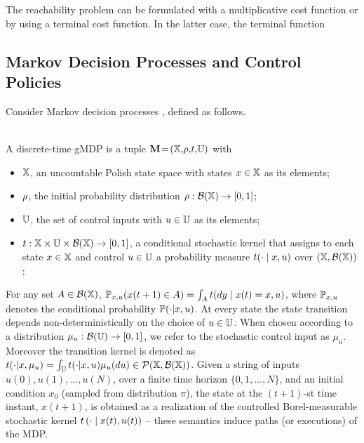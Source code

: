 \documentclass{ifacconf}
\begin{document}
The reachability problem can be formulated with a multiplicative cost function or by using a terminal cost function. In the latter case, the terminal function 


\subsection{Markov Decision Processes and Control Policies}
Consider Markov decision processes \citep{Bertsekas2012,mt1993,hll1996}, defined as follows.%
\begin{definition}\label{def:MDP} \mbox{ }\\
  A discrete-time gMDP is a tuple ${\mathbf{M}}\!=\!({\mathbb{X}},\!\rho,\!t,\!{\mathbb{U}})$ with
  \begin{itemize}
    \item ${\mathbb{X}}$,  an uncountable Polish state space with states $x\in{\mathbb{X}}$ as its elements;
    \item $\rho$, the initial probability distribution $\rho:\mathcal{B}({\mathbb{X}})\rightarrow [0,1]$;
    \item ${\mathbb{U}}$, the set of control inputs with $u\in{\mathbb{U}}$ as its elements;
    \item $t:{\mathbb{X}}\times{\mathbb{U}}\times\mathcal B({\mathbb{X}})\rightarrow[0,1]$, a conditional stochastic kernel that assigns to each state $x\in {\mathbb{X}}$ and control $u\in {\mathbb{U}}$ a probability measure $t(\cdot\mid x,u)$ over $({\mathbb{X}},\mathcal B({\mathbb{X}}))$;
  \end{itemize}
\end{definition}
For any set $A\in \mathcal{B}({\mathbb{X}})$, $\po_{x,u}(x(t+1)\in A)=\int_A \tr(dy\mid x(t)=x,u)$, where $\mathbb{P}_{x,u}$ denotes the conditional probability $\mathbb{P}(\cdot{\mid} x,u)$.
At every state the state transition depends non-deterministically on the choice of $u\in {\mathbb{U}}$.
When chosen according to
a distribution  $\mu_u:\mathcal{B}({\mathbb{U}})\rightarrow [0,1]$, we refer to the stochastic control input as $\mu_u$. Moreover
the transition kernel is denoted as $\tr(\cdot| x, \mu_u)=\int_\U \tr(\cdot| x, u) \mu_u(du)\in \mathcal P(\X,\mathcal B(\X))$.
Given a string of inputs
$u(0), u(1), \ldots, u(N)$,
over a finite time horizon $\{0,1,\ldots, N\}$,
and an initial condition  $x_0$ (sampled from distribution $\pi$),
the state at the $(t+1)$-st time instant, $x(t+1)$,
is obtained as a realization of the controlled Borel-measurable stochastic kernel $t\left(\cdot\mid x(t), u(t) \right)$ --
these semantics induce paths (or executions) of the MDP.
 

 
\end{document}
